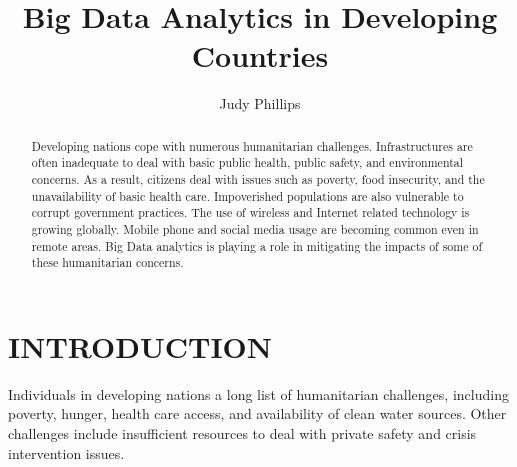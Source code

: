 \documentclass[sigconf]{acmart}
\begin{document}
\title{Big Data Analytics in Developing Countries}


\author{Judy Phillips}

\renewcommand{\shortauthors}{B. Trovato et al.}


\begin{abstract}
Developing nations cope with numerous humanitarian challenges. Infrastructures are often inadequate to deal with basic public health, public safety, and environmental concerns. As a result, citizens deal with issues such as poverty, food insecurity, and the unavailability of basic health care. Impoverished populations are also vulnerable to corrupt government practices. The use of wireless and Internet related technology is growing globally. Mobile phone and social media usage are becoming common even in remote areas. Big Data analytics is playing a role in mitigating the impacts of some of these humanitarian concerns. 
\end{abstract}



\maketitle

\section{INTRODUCTION}

Individuals in developing nations a long list of humanitarian challenges, including poverty, hunger, health care access, and availability of clean water sources. Other challenges include insufficient resources to deal with private safety and crisis intervention issues.
\end{document}
